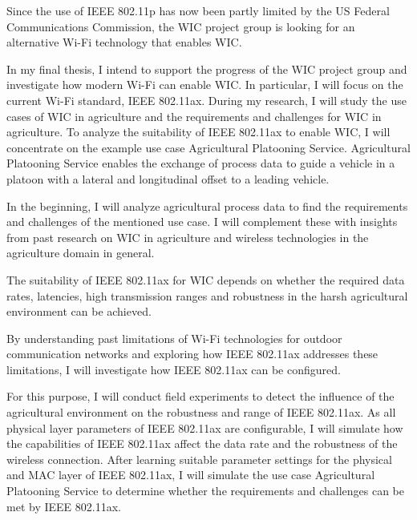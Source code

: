 Since the use of IEEE 802.11p has now been partly limited by the  US Federal Communications Commission, the
WIC project group is looking for an alternative Wi-Fi technology that enables \ac{WIC}.

In my final thesis, I intend to support the progress of the \ac{WIC} project group and investigate how modern Wi-Fi can enable \ac{WIC}.
 In particular, I will focus on the current Wi-Fi standard, IEEE 802.11ax.
During my research, I will study the use cases of \ac{WIC} in agriculture and the requirements and challenges for \ac{WIC} in agriculture.
To analyze the suitability of IEEE 802.11ax to enable \ac{WIC}, I will concentrate on the example use case Agricultural Platooning Service.
Agricultural Platooning Service enables the exchange of process data
to guide a vehicle in a platoon with a lateral and longitudinal offset to a leading vehicle.

In the beginning, I will analyze agricultural process data to find the requirements and challenges of the mentioned use case.
I will complement these with insights from past research on \ac{WIC} in agriculture and wireless technologies
in the agriculture domain in general.

The suitability of IEEE 802.11ax for \ac{WIC} depends on whether the required data rates, latencies, high
transmission ranges and robustness in the harsh agricultural environment can be achieved.

By understanding past limitations of Wi-Fi technologies for outdoor communication networks
and exploring how IEEE 802.11ax addresses these limitations, I will investigate how IEEE 802.11ax can be configured.

For this purpose, I will conduct field experiments to detect the influence of the agricultural environment on the robustness and range of IEEE 802.11ax.
As all physical layer parameters of IEEE 802.11ax are configurable, I will simulate how the capabilities of IEEE 802.11ax affect the data rate and the robustness of the wireless connection.
After learning suitable parameter settings for the physical and MAC layer of IEEE 802.11ax, I will simulate the use case
Agricultural Platooning Service to determine whether the requirements and challenges
can be met by IEEE 802.11ax.
